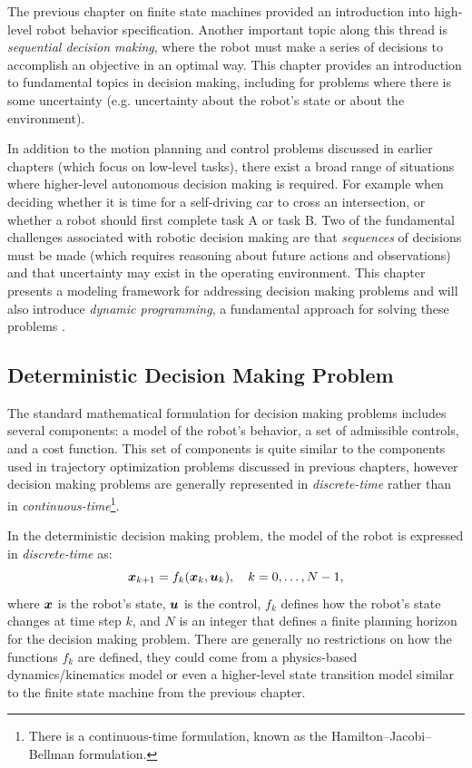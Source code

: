 The previous chapter on finite state machines provided an introduction into high-level robot behavior specification. Another important topic along this thread is \textit{sequential decision making}\cite{Bertsekas2019}, where the robot must make a series of decisions to accomplish an objective in an optimal way. This chapter provides an introduction to fundamental topics in decision making, including for problems where there is some uncertainty (e.g. uncertainty about the robot's state or about the environment).

In addition to the motion planning and control problems discussed in earlier chapters (which focus on low-level tasks), there exist a broad range of situations where higher-level autonomous decision making is required. For example when deciding whether it is time for a self-driving car to cross an intersection, or whether a robot should first complete task A or task B.
Two of the fundamental challenges associated with robotic decision making are that \textit{sequences} of decisions must be made (which requires reasoning about future actions and observations) and that uncertainty may exist in the operating environment. This chapter presents a modeling framework for addressing decision making problems and will also introduce \textit{dynamic programming}, a fundamental approach for solving these problems .


\subsection{Deterministic Decision Making Problem}
The standard mathematical formulation for decision making problems includes several components: a model of the robot's behavior, a set of admissible controls, and a cost function. This set of components is quite similar to the components used in trajectory optimization problems discussed in previous chapters, however decision making problems are generally represented in \textit{discrete-time} rather than in \textit{continuous-time}\footnote{There is a continuous-time formulation, known as the Hamilton–Jacobi–Bellman formulation.}.

In the deterministic decision making problem, the model of the robot is expressed in \textit{discrete-time} as:
\begin{equation} \label{eq:detmodel}
\bm{x}_{k+1}= f_k(\bm{x}_k, \bm{u}_k), \quad k = 0, \dots, N-1,
\end{equation}
where $\bm{x}$ is the robot's state, $\bm{u}$ is the control, $f_k$ defines how the robot's state changes at time step $k$, and $N$ is an integer that defines a finite planning horizon for the decision making problem. There are generally no restrictions on how the functions $f_k$ are defined, they could come from a physics-based dynamics/kinematics model or even a higher-level state transition model similar to the finite state machine from the previous chapter.

